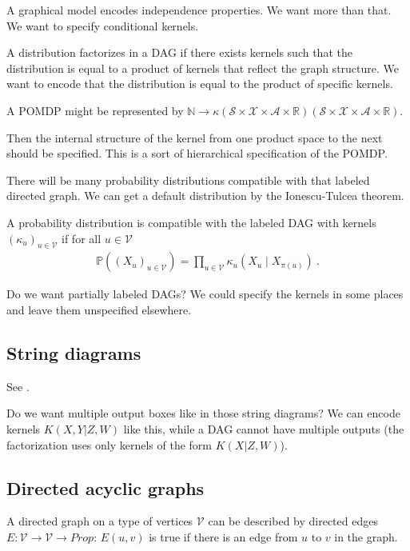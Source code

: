 
A graphical model encodes independence properties. We want more than that. We want to specify conditional kernels.

A distribution factorizes in a DAG if there exists kernels such that the distribution is equal to a product of kernels that reflect the graph structure.
We want to encode that the distribution is equal to the product of specific kernels.

A POMDP might be represented by $\mathbb{N} \to \kappa (\mathcal S \times \mathcal X \times \mathcal A \times \mathbb{R}) (\mathcal S \times \mathcal X \times \mathcal A \times \mathbb{R})$.

Then the internal structure of the kernel from one product space to the next should be specified. This is a sort of hierarchical specification of the POMDP.

There will be many probability distributions compatible with that labeled directed graph. We can get a default distribution by the Ionescu-Tulcea theorem.

A probability distribution is compatible with the labeled DAG with kernels $(\kappa_u)_{u \in \mathcal V}$ if for all $u \in \mathcal V$
\begin{align*}
\mathbb{P}((X_u)_{u \in \mathcal V}) = \prod_{u \in \mathcal V} \kappa_u(X_u \mid X_{\pi(u)}) \: .
\end{align*}

Do we want partially labeled DAGs? We could specify the kernels in some places and leave them unspecified elsewhere.

\subsection{String diagrams}
\label{sub:string_diagrams}

See \cite{fritz2023d}.

Do we want multiple output boxes like in those string diagrams? We can encode kernels $K(X,Y|Z,W)$ like this, while a DAG cannot have multiple outputs (the factorization uses only kernels of the form $K(X | Z, W)$).

\subsection{Directed acyclic graphs}
\label{sub:directed_acyclic_graphs}

A directed graph on a type of vertices $\mathcal V$ can be described by directed edges $E : \mathcal V \to \mathcal V \to Prop$: $E(u,v)$ is true if there is an edge from $u$ to $v$ in the graph.

